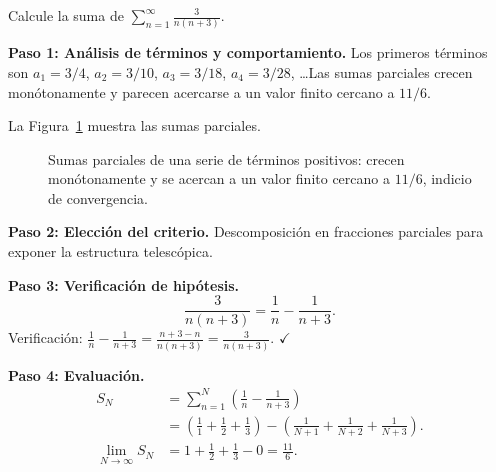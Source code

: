 \begin{example}
Calcule la suma de $\displaystyle\sum_{n=1}^\infty \frac{3}{n(n+3)}$.
\begin{myproof}
\textbf{Paso 1: Análisis de términos y comportamiento.}
Los primeros términos son $a_1 = 3/4$, $a_2 = 3/10$, $a_3 = 3/18$,
$a_4 = 3/28$, \ldots Las sumas parciales crecen monótonamente y parecen
acercarse a un valor finito cercano a $11/6$.

La Figura~\ref{fig:serie_sumas_parciales_convergente} muestra las sumas parciales.

\begin{figure}[H]
\centering
{}
\caption{Sumas parciales de una serie de términos positivos: crecen monótonamente y se acercan a un valor finito cercano a $11/6$, indicio de convergencia.}
\label{fig:serie_sumas_parciales_convergente}
\end{figure}

\textbf{Paso 2: Elección del criterio.}
Descomposición en fracciones parciales para exponer la estructura
telescópica.

\textbf{Paso 3: Verificación de hipótesis.}
\[
  \frac{3}{n(n+3)} = \frac{1}{n} - \frac{1}{n+3}.
\]
Verificación: $\frac{1}{n}-\frac{1}{n+3}=\frac{n+3-n}{n(n+3)}=
\frac{3}{n(n+3)}$. $\checkmark$

\textbf{Paso 4: Evaluación.}
\begin{align*}
  S_N &= \sum_{n=1}^N \left(\frac{1}{n}-\frac{1}{n+3}\right) \\
  &= \left(\frac{1}{1}+\frac{1}{2}+\frac{1}{3}\right)
     - \left(\frac{1}{N+1}+\frac{1}{N+2}+\frac{1}{N+3}\right). \\
  \lim_{N\to\infty} S_N
  &= 1 + \frac{1}{2} + \frac{1}{3} - 0 = \boxed{\frac{11}{6}}.
\end{align*}
\end{myproof}
\end{example}


